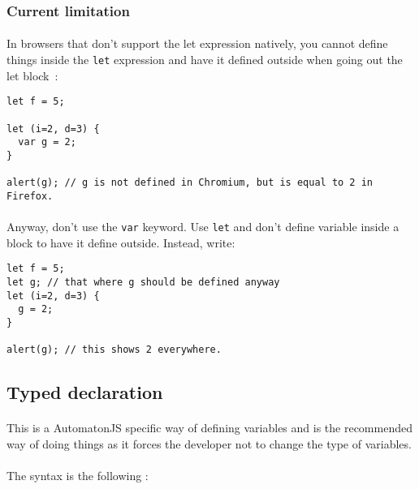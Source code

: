 \documentclass{article}
\begin{document}
\begin{sloppypar}
      

\subsubsection{ Current limitation}


\paragraph{}
In browsers that don't support the let expression natively, you cannot define things inside the \lstinline!let! expression and have it defined outside when going out the let block :
{\begin{lstlisting}
let f = 5;

let (i=2, d=3) {
  var g = 2;
}

alert(g); // g is not defined in Chromium, but is equal to 2 in Firefox.
\end{lstlisting}
}


         
\paragraph{}
Anyway, don't use the \lstinline!var! keyword. Use \lstinline!let! and don't define variable inside a block to have it define outside. Instead, write:

{\begin{lstlisting}
let f = 5;
let g; // that where g should be defined anyway
let (i=2, d=3) {
  g = 2;
}

alert(g); // this shows 2 everywhere.
\end{lstlisting}
}

      
   
   
   

\subsection{ Typed declaration}


\paragraph{}
This is a AutomatonJS specific way of defining variables and is the recommended way of doing things as it forces the developer not to change the type of variables.
      
      
\paragraph{}
The syntax is the following :
      

\end{sloppypar}
\end{document}
